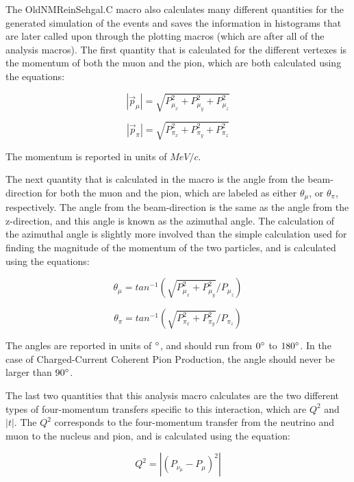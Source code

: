 \documentclass[11pt]{article}
\begin{document}
The OldNMReinSehgal.C macro also calculates many different quantities for the generated simulation of the events and saves the information in histograms that are later called upon through the plotting macros (which are after all of the analysis macros). The first quantity that is calculated for the different vertexes is the momentum of both the muon and the pion, which are both calculated using the equations:

\begin{equation}
|\vec{p}_\mu| = \sqrt{P_{\mu_x}^2 + P_{\mu_y}^2 + P_{\mu_z}^2}
\end{equation}

\begin{equation}
|\vec{p}_\pi| = \sqrt{P_{\pi_x}^2 + P_{\pi_y}^2 + P_{\pi_z}^2}
\end{equation}

\noindent
The momentum is reported in units of $MeV/c$.

The next quantity that is calculated in the macro is the angle from the beam-direction for both the muon and the pion, which are labeled as either $\theta_\mu$, or $\theta_\pi$, respectively. The angle from the beam-direction is the same as the angle from the z-direction, and this angle is known as the azimuthal angle. The calculation of the azimuthal angle is slightly more involved than the simple calculation used for finding the magnitude of the momentum of the two particles, and is calculated using the equations:

\begin{equation}
\theta_\mu = tan^{-1}(\sqrt{P_{\mu_x}^2 + P_{\mu_y}^2}/{P_{\mu_z}})
\end{equation}

\begin{equation}
\theta_\pi = tan^{-1}(\sqrt{P_{\pi_x}^2 + P_{\pi_y}^2}/{P_{\pi_z}})
\end{equation}

\noindent
The angles are reported in units of $\degree$, and should run from $0\degree$ to $180\degree$. In the case of Charged-Current Coherent Pion Production, the angle should never be larger than $90\degree$.

The last two quantities that this analysis macro calculates are the two different types of four-momentum transfers specific to this interaction, which are $Q^2$ and $|t|$. The $Q^2$ corresponds to the four-momentum transfer from the neutrino and muon to the nucleus and pion, and is calculated using the equation:

\begin{equation}
Q^2 = |(P_{\nu_\mu} - P_\mu)^2|
\end{equation}
\end{document}
